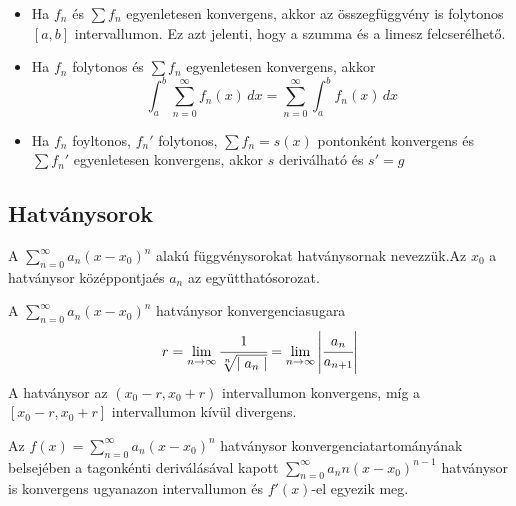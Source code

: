 \documentclass[a4paper, 12pt]{scrartcl}
\begin{document}
\begin{blueBox}
    \begin{itemize}
        \item[] Ha $f_n$ és $\displaystyle \sum f_n$ egyenletesen konvergens, akkor az összegfüggvény is folytonos $[a,b]$ intervallumon. Ez azt jelenti, hogy a szumma és a limesz felcserélhető.
    \end{itemize}
\end{blueBox}
\begin{blueBox}
\begin{itemize}
    \item[] Ha $f_n$ folytonos és $\displaystyle \sum f_n$ egyenletesen konvergens, akkor
    \[
    \int_{a}^{b} \sum_{n=0}^{\infty} f_n(x)\, dx = \sum_{n=0}^{\infty} \int_{a}^{b} f_n(x)\, dx 
    \]
    \item[] Ha $f_n$ foyltonos, $f_n'$ folytonos, $\displaystyle \sum f_n = s(x)$ pontonként konvergens és $\displaystyle \sum f_n'$ egyenletesen konvergens, akkor $s$ deriválható és $s' = g$
\end{itemize}
\end{blueBox}

\subsection{Hatványsorok}

\begin{definition}[Hatványsor]
    A $\displaystyle \sum_{n=0}^{\infty} a_n(x-x_0)^n$ alakú függvénysorokat hatványsornak nevezzük.Az $x_0$ a hatványsor középpontjaés $a_n$ 
    az együtthatósorozat.
\end{definition}

\begin{theorem}
    A $\displaystyle \sum_{n=0}^{\infty} a_n(x-x_0)^n$ hatványsor konvergenciasugara
    \[
    r = \lim_{n \to \infty}\cfrac{1}{\sqrt[n]{\mid a_n \mid}} = \lim_{n \to \infty} \left|\cfrac{a_n }{a_{n+1}}\right|
    \]
    A hatványsor az $(x_0-r,x_0+r)$ intervallumon konvergens, míg a $[x_0-r, x_0+r]$ intervallumon kívül divergens.
\end{theorem}

\begin{theorem}
    Az $f(x) = \displaystyle \sum_{n=0}^{\infty}a_n(x-x_0)^n$ hatványsor kon\-ver\-gen\-ci\-a\-tar\-to\-má\-nyá\-nak belsejében a tagonkénti deriválásával kapott $\displaystyle \sum_{n=0}^{\infty}a_n n (x-x_0)^{n-1}$ hatványsor is konvergens ugyanazon intervallumon és $f'(x)$-el egyezik meg.
\end{theorem}
\end{document}
